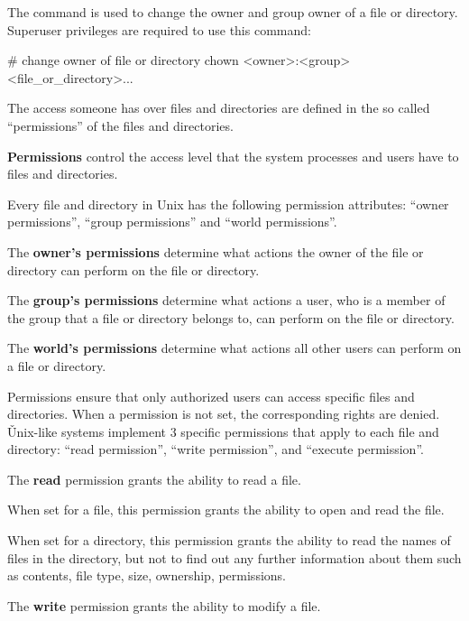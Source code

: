 The  command is used to change the owner and group owner of a file or directory. Superuser privileges are
required to use this command:
\begin{bash}
# change owner of file or directory
chown <owner>:<group> <file_or_directory>...
\end{bash}

The access someone has over files and directories are defined in the so called ``permissions'' of the files and
directories.

\bd[Permissions]
\textbf{Permissions} control the access level that the system processes and users have to files and directories.
\ed

Every file and directory in Unix has the following permission attributes: ``owner permissions'', ``group permissions''
and ``world permissions''.

The \textbf{owner's permissions} determine what actions the owner of the file or directory can perform on the file or
directory.
\ed

The \textbf{group's permissions} determine what actions a user, who is a member of the group that a file or directory
belongs to, can perform on the file or directory.
\ed

The \textbf{world's permissions} determine what actions all other users can perform on a file or directory.
\ed

Permissions ensure that only authorized users can access specific files and directories. When a permission is not set,
the corresponding rights are denied. \v

Unix-like systems implement 3 specific permissions that apply to each file and directory: ``read permission'', ``write
permission'', and ``execute permission''.

The \textbf{read} permission grants the ability to read a file.
\ed

\bit
\item When set for a file, this permission grants the ability to open and read the file.
\item When set for a directory, this permission grants the ability to read the names of files in the directory, but not
to find out any further information about them such as contents, file type, size, ownership, permissions.
\eit

The \textbf{write} permission grants the ability to modify a file.
\ed

